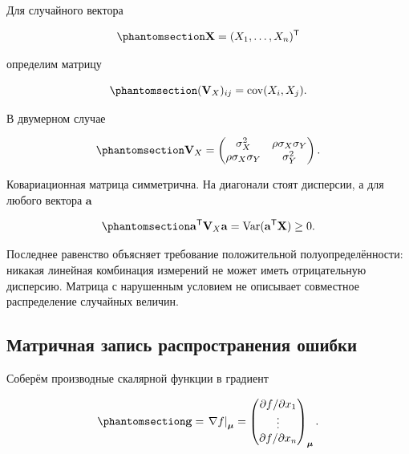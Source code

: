 \documentclass[
  russian,
  11pt,
  a4paper,
  open=any]{scrbook}
\begin{document}
Для случайного вектора

\begin{equation}\protect\phantomsection\label{eq-ch6-random-vector-definition}{
\mathbf X=(X_1,\ldots,X_n)^{\mathsf T}
}\end{equation}

определим матрицу

\begin{equation}\protect\phantomsection\label{eq-ch6-covariance-matrix-definition}{
(\mathbf V_X)_{ij}
=\operatorname{cov}(X_i,X_j).
}\end{equation}

В двумерном случае

\begin{equation}\protect\phantomsection\label{eq-ch6-two-dimensional-covariance-matrix}{
\mathbf V_X=
\begin{pmatrix}
\sigma_X^2 & \rho\sigma_X\sigma_Y\\
\rho\sigma_X\sigma_Y & \sigma_Y^2
\end{pmatrix}.
}\end{equation}

Ковариационная матрица симметрична. На диагонали стоят дисперсии, а для
любого вектора \(\mathbf a\)

\begin{equation}\protect\phantomsection\label{eq-ch6-covariance-positive-semidefinite}{
\mathbf a^{\mathsf T}\mathbf V_X\mathbf a
=\operatorname{Var}(\mathbf a^{\mathsf T}\mathbf X)
\ge0.
}\end{equation}

Последнее равенство объясняет требование положительной
полуопределённости: никакая линейная комбинация измерений не может иметь
отрицательную дисперсию. Матрица с нарушенным условием не описывает
совместное распределение случайных величин.

\subsection{Матричная запись распространения
ошибки}\label{ux43cux430ux442ux440ux438ux447ux43dux430ux44f-ux437ux430ux43fux438ux441ux44c-ux440ux430ux441ux43fux440ux43eux441ux442ux440ux430ux43dux435ux43dux438ux44f-ux43eux448ux438ux431ux43aux438}

Соберём производные скалярной функции в градиент

\begin{equation}\protect\phantomsection\label{eq-ch6-gradient-vector}{
\mathbf g=
\left.
\nabla f
\right|_{\boldsymbol\mu}
=
\begin{pmatrix}
\partial f/\partial x_1\\
\vdots\\
\partial f/\partial x_n
\end{pmatrix}_{\boldsymbol\mu}.
}\end{equation}
\end{document}
